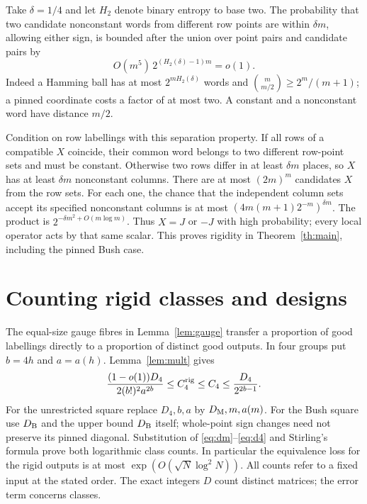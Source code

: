 \documentclass[11pt,reqno]{amsart}
\theoremstyle{remark}\newtheorem{remark}[theorem]{Remark}
\begin{document}
Take \(\delta=1/4\) and let \(H_2\) denote binary entropy to base two. The probability that two candidate nonconstant words from different row points are within \(\delta m\), allowing either sign, is bounded after the union over point pairs and candidate pairs by
\[
 O(m^5)\,2^{(H_2(\delta)-1)m}=o(1).
\]
Indeed a Hamming ball has at most \(2^{mH_2(\delta)}\) words and
\(\binom m{m/2}\ge 2^m/(m+1)\); a pinned coordinate costs a factor of at most two. A constant and a nonconstant word have distance \(m/2\).

Condition on row labellings with this separation property. If all rows of a compatible \(X\) coincide, their common word belongs to two different row-point sets and must be constant. Otherwise two rows differ in at least \(\delta m\) places, so \(X\) has at least \(\delta m\) nonconstant columns. There are at most \((2m)^m\) candidates \(X\) from the row sets. For each one, the chance that the independent column sets accept its specified nonconstant columns is at most \((4m(m+1)2^{-m})^{\delta m}\). The product is \(2^{-\delta m^2+O(m\log m)}\). Thus \(X=J\) or \(-J\) with high probability; every local operator acts by that same scalar. This proves rigidity in Theorem~\ref{th:main}, including the pinned Bush case.

\section{Counting rigid classes and designs}
The equal-size gauge fibres in Lemma~\ref{lem:gauge} transfer a proportion of good labellings directly to a proportion of distinct good outputs. In four groups put \(b=4h\) and \(a=a(h)\). Lemma~\ref{lem:mult} gives
\[
 \frac{(1-o(1))D_4}{2(b!)^2a^{2b}}
 \le C_4^{\rm rig}\le C_4\le \frac{D_4}{2^{2b-1}} .
\]
For the unrestricted square replace \(D_4,b,a\) by \(D_{\rm M},m,a(m)\). For the Bush square use \(D_{\rm B}\) and the upper bound \(D_{\rm B}\) itself; whole-point sign changes need not preserve its pinned diagonal. Substitution of \eqref{eq:dm}--\eqref{eq:d4} and Stirling's formula prove both logarithmic class counts. In particular the equivalence loss for the rigid outputs is at most \(\exp(O(\sqrt N\log^2 N))\). All counts refer to a fixed input at the stated order. The exact integers \(D\) count distinct matrices; the error term concerns classes.
\end{document}
